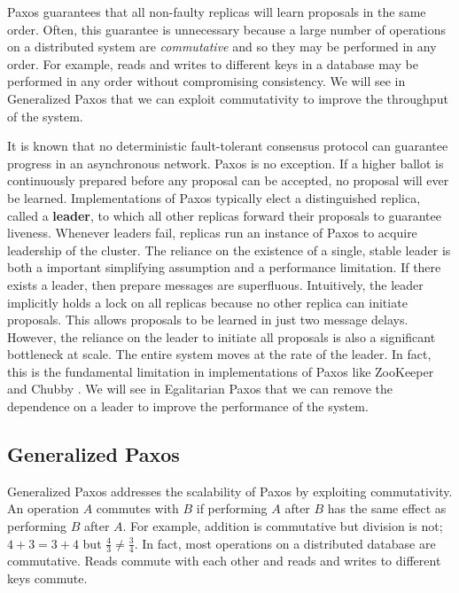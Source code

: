 \documentclass[../main.tex]{subfiles}
\begin{document}
  Paxos guarantees that all non-faulty replicas will learn proposals in the same order. Often, this
  guarantee is unnecessary because a large number of operations on a distributed system are
  \emph{commutative} and so they may be performed in any order. For example, reads and writes to
  different keys in a database may be performed in any order without compromising consistency. We
  will see in Generalized Paxos that we can exploit commutativity to improve the throughput of the
  system.

  It is known that no deterministic fault-tolerant consensus protocol can guarantee progress in an
  asynchronous network. \cite{consensus} Paxos is no exception. If a higher ballot is continuously
  prepared before any proposal can be accepted, no proposal will ever be learned. Implementations of
  Paxos typically elect a distinguished replica, called a \textbf{leader}, to which all other
  replicas forward their proposals to guarantee liveness. Whenever leaders fail, replicas run an
  instance of Paxos to acquire leadership of the cluster. The reliance on the existence of a single,
  stable leader is both a important simplifying assumption and a performance limitation. If there
  exists a leader, then prepare messages are superfluous. Intuitively, the leader implicitly holds
  a lock on all replicas because no other replica can initiate proposals. This allows proposals to
  be learned in just two message delays. However, the reliance on the leader to initiate all
  proposals is also a significant bottleneck at scale. The entire system moves at the rate of the
  leader. In fact, this is the fundamental limitation in implementations of Paxos like ZooKeeper
  \cite{zookeeper} and Chubby \cite{chubby}. We will see in Egalitarian Paxos that we can remove the
  dependence on a leader to improve the performance of the system.

  \subsection{Generalized Paxos}
  Generalized Paxos addresses the scalability of Paxos by exploiting commutativity. An operation
  $A$ commutes with $B$ if performing $A$ after $B$ has the same effect as performing $B$ after $A$.
  For example, addition is commutative but division is not; $4 + 3 = 3 + 4$ but $\frac{4}{3} \ne
  \frac{3}{4}$. In fact, most operations on a distributed database are commutative. Reads commute
  with each other and reads and writes to different keys commute. \cite{generalized-paxos}
\end{document}
